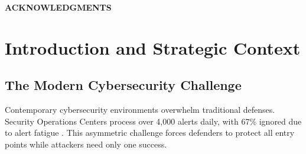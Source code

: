 \documentclass[12pt,oneside]{article}
\begin{document}
\clearpage
\begin{center}
\large\textbf{ACKNOWLEDGMENTS}
\end{center}

\clearpage

\listoffigures
\clearpage

\listoftables
\clearpage

\setcounter{page}{1}
\pagestyle{fancy}
\fancyhf{}
\fancyfoot[C]{\thepage}
\clearpage
\section{Introduction and Strategic Context}

\subsection{The Modern Cybersecurity Challenge}

Contemporary cybersecurity environments overwhelm traditional defenses. Security Operations Centers process over 4,000 alerts daily, with 67\% ignored due to alert fatigue \cite{zhang2024survey}. This asymmetric challenge forces defenders to protect all entry points while attackers need only one success.
\end{document}
